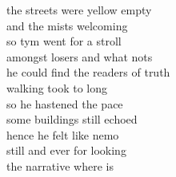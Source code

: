 the streets were yellow empty\\
and the mists welcoming\\
so tym went for a stroll\\
amongst losers and what nots\\
he could find the readers of truth\\

walking took to long\\
so he hastened the pace\\
some buildings still echoed\\
hence he felt like nemo\\
still and ever for looking\\
the narrative where is\\
